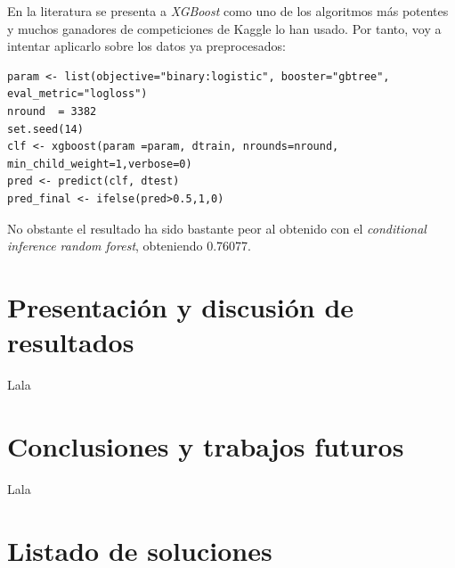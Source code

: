 En la literatura se presenta a \textit{XGBoost} como uno de los algoritmos más potentes y muchos ganadores de competiciones de Kaggle lo han usado. Por tanto, voy a intentar aplicarlo sobre los datos ya preprocesados:

\begin{lstlisting}[style=R]
param <- list(objective="binary:logistic", booster="gbtree", eval_metric="logloss")
nround  = 3382
set.seed(14)
clf <- xgboost(param =param, dtrain, nrounds=nround, min_child_weight=1,verbose=0)
pred <- predict(clf, dtest)
pred_final <- ifelse(pred>0.5,1,0) 
\end{lstlisting}

No obstante el resultado ha sido bastante peor al obtenido con el \textit{conditional inference random forest}, obteniendo 0.76077.

\section{Presentación y discusión de resultados}

Lala

\section{Conclusiones y trabajos futuros}

Lala

\section{Listado de soluciones}

